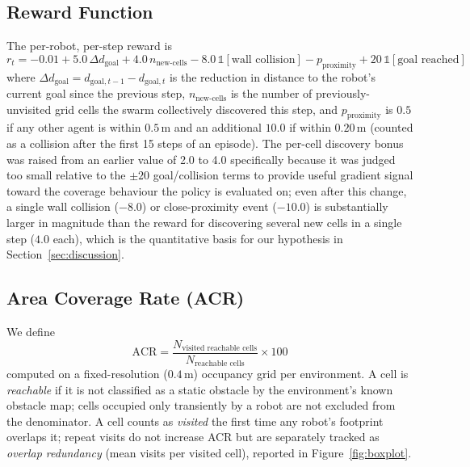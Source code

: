 \documentclass[11pt]{article}
\begin{document}
\subsection{Reward Function}
The per-robot, per-step reward is
\begin{equation}
r_t = -0.01 + 5.0\,\Delta d_{\text{goal}} + 4.0\,n_{\text{new-cells}} - 8.0\,\mathds{1}[\text{wall collision}] - p_{\text{proximity}} + 20\,\mathds{1}[\text{goal reached}]
\end{equation}
where $\Delta d_{\text{goal}} = d_{\text{goal}, t-1} - d_{\text{goal}, t}$ is the reduction in distance to the
robot's current goal since the previous step, $n_{\text{new-cells}}$ is
the number of previously-unvisited grid cells the swarm collectively
discovered this step, and $p_{\text{proximity}}$ is $0.5$ if any other
agent is within $0.5$\,m and an additional $10.0$ if within $0.20$\,m
(counted as a collision after the first 15 steps of an episode). The
per-cell discovery bonus was raised from an earlier value of 2.0 to 4.0
specifically because it was judged too small relative to the $\pm 20$
goal/collision terms to provide useful gradient signal toward the
coverage behaviour the policy is evaluated on; even after this change, a
single wall collision ($-8.0$) or close-proximity event ($-10.0$) is
substantially larger in magnitude than the reward for discovering several
new cells in a single step ($4.0$ each), which is the quantitative basis
for our hypothesis in Section~\ref{sec:discussion}.

\subsection{Area Coverage Rate (ACR)}
We define
\begin{equation}
\text{ACR} = \frac{N_{\text{visited reachable cells}}}{N_{\text{reachable cells}}}\times 100
\end{equation}
computed on a fixed-resolution ($0.4$\,m) occupancy grid per environment.
A cell is \emph{reachable} if it is not classified as a static obstacle
by the environment's known obstacle map; cells occupied only transiently
by a robot are not excluded from the denominator. A cell counts as
\emph{visited} the first time any robot's footprint overlaps it; repeat
visits do not increase ACR but are separately tracked as \emph{overlap
redundancy} (mean visits per visited cell), reported in
Figure~\ref{fig:boxplot}.
\end{document}
